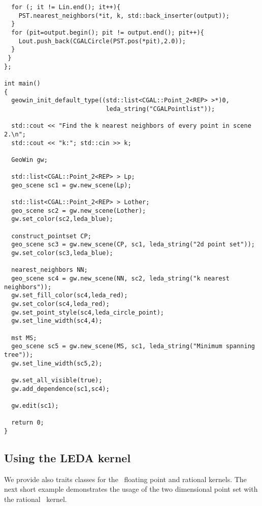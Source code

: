 \begin{verbatim}
  for (; it != Lin.end(); it++){
    PST.nearest_neighbors(*it, k, std::back_inserter(output));
  } 
  for (pit=output.begin(); pit != output.end(); pit++){
    Lout.push_back(CGALCircle(PST.pos(*pit),2.0));
  } 
 }
};

int main()
{
  geowin_init_default_type((std::list<CGAL::Point_2<REP> >*)0, 
                            leda_string("CGALPointlist"));
    
  std::cout << "Find the k nearest neighbors of every point in scene 2.\n";
  std::cout << "k:"; std::cin >> k;
  
  GeoWin gw;

  std::list<CGAL::Point_2<REP> > Lp;
  geo_scene sc1 = gw.new_scene(Lp);
  
  std::list<CGAL::Point_2<REP> > Lother;
  geo_scene sc2 = gw.new_scene(Lother);
  gw.set_color(sc2,leda_blue);
  
  construct_pointset CP;
  geo_scene sc3 = gw.new_scene(CP, sc1, leda_string("2d point set"));
  gw.set_color(sc3,leda_blue);
  
  nearest_neighbors NN;
  geo_scene sc4 = gw.new_scene(NN, sc2, leda_string("k nearest neighbors"));
  gw.set_fill_color(sc4,leda_red);
  gw.set_color(sc4,leda_red);
  gw.set_point_style(sc4,leda_circle_point);
  gw.set_line_width(sc4,4);
  
  mst MS;
  geo_scene sc5 = gw.new_scene(MS, sc1, leda_string("Minimum spanning tree"));
  gw.set_line_width(sc5,2);
 
  gw.set_all_visible(true);
  gw.add_dependence(sc1,sc4);
   
  gw.edit(sc1);

  return 0;
}
\end{verbatim}


\ccHtmlLinksOn

\subsection{Using the LEDA kernel}

We provide also traits classes for the \leda\ floating point and rational kernels. The next short
example demonstrates the usage of the two dimensional point set with the rational \leda\ kernel.

\ccHtmlLinksOff

